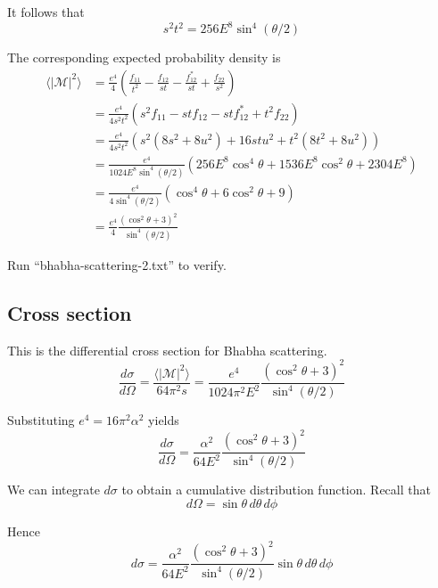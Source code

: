 \documentclass[12pt]{article}
\begin{document}
\noindent
It follows that
\begin{equation*}
s^2t^2=256E^8\sin^4(\theta/2)
\end{equation*}

\noindent
The corresponding expected probability density is
\begin{align*}
\langle|\mathcal{M}|^2\rangle
&=\frac{e^4}{4}
\left(
\frac{f_{11}}{t^2} - \frac{f_{12}}{st} -
\frac{f_{12}^*}{st} + \frac{f_{22}}{s^2}
\right)
\\
&=\frac{e^4}{4s^2t^2}
\left(
s^2f_{11}-stf_{12}-stf_{12}^*+t^2f_{22}
\right)
\\
&=\frac{e^4}{4s^2t^2}
\left(
s^2\left(8s^2+8u^2\right)+16stu^2+t^2\left(8t^2+8u^2\right)
\right)
\\
&=\frac{e^4}{1024E^8\sin^4(\theta/2)}
\left(
256E^8\cos^4\theta+1536E^8\cos^2\theta+2304E^8
\right)
\\
&=\frac{e^4}{4\sin^4(\theta/2)}
\left(\cos^4\theta+6\cos^2\theta+9\right)
\\
&=\frac{e^4}{4}
\frac{\left(\cos^2\theta+3\right)^2}{\sin^4(\theta/2)}
\end{align*}

\noindent
Run ``bhabha-scattering-2.txt'' to verify.

\subsection*{Cross section}
This is the differential cross section for Bhabha scattering.
\begin{equation*}
\frac{d\sigma}{d\Omega}
=\frac{\langle|\mathcal{M}|^2\rangle}{64\pi^2s}
=\frac{e^4}{1024\pi^2E^2}
\frac{\left(\cos^2\theta+3\right)^2}{\sin^4(\theta/2)}
\end{equation*}

\noindent
Substituting $e^4=16\pi^2\alpha^2$ yields
\begin{equation*}
\frac{d\sigma}{d\Omega}
=\frac{\alpha^2}{64E^2}
\frac{\left(\cos^2\theta+3\right)^2}{\sin^4(\theta/2)}
\end{equation*}

\noindent
We can integrate $d\sigma$ to obtain a cumulative distribution function.
Recall that
\begin{equation*}
d\Omega=\sin\theta\,d\theta\,d\phi
\end{equation*}

\noindent
Hence
\begin{equation*}
d\sigma=\frac{\alpha^2}{64E^2}
\frac{\left(\cos^2\theta+3\right)^2}{\sin^4(\theta/2)}\sin\theta\,d\theta\,d\phi
\end{equation*}
\end{document}
